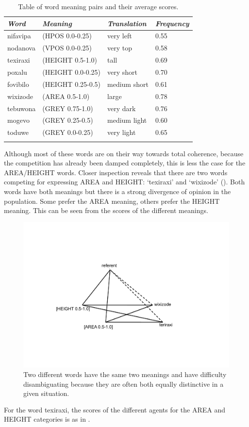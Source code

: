 \begin{table}
\begin{center}
\begin{tabular}{ l  l  l  l }
\lsptoprule
{\itshape Word}&{\itshape Meaning}& {\itshape Translation} & {\itshape Frequency} \\ \midrule
nifavipa & (HPOS 0.0-0.25) & very left & 0.55 \\ 
nodanova & (VPOS 0.0-0.25) & very top & 0.58  \\ 
texiraxi & (HEIGHT 0.5-1.0) & tall & 0.69  \\ 
poxalu & (HEIGHT 0.0-0.25) & very short & 0.70  \\ 
fovibilo & (HEIGHT 0.25-0.5) & medium short & 0.61  \\ 
wixizode & (AREA 0.5-1.0) & large & 0.78  \\ 
tebuwona & (GREY 0.75-1.0) & very dark & 0.76  \\ 
mogevo & (GREY 0.25-0.5) & medium light & 0.60  \\ 
toduwe & (GREY 0.0-0.25) & very light & 0.65  \\ 
\lspbottomrule
\end{tabular}
\caption{\label{tab:freq} Table of word meaning pairs and their average scores.}
\end{center}
\end{table}
Although most of these words are on their way towards
total coherence, because the competition has already 
been damped completely, this is less the case for 
the AREA/HEIGHT words. Closer inspection reveals that 
there are two words competing for expressing
AREA and HEIGHT: `texiraxi' and `wixizode'
(). Both words have both meanings
but there is a strong divergence of opinion in the 
population. Some prefer the AREA meaning, others prefer
the HEIGHT meaning. This can be seen from the scores of 
the different meanings.


\begin{figure}[htbp]
  \centerline{\includegraphics[width=.60\textwidth]{chap6/figs/triangle7}}
\caption{\label{triangle7} Two different words have the 
same two meanings and have difficulty disambiguating because
they are often both equally distinctive in a given situation.}
\end{figure}
For the word texiraxi, the scores of the different 
agents for the AREA and HEIGHT categories is as in . 


